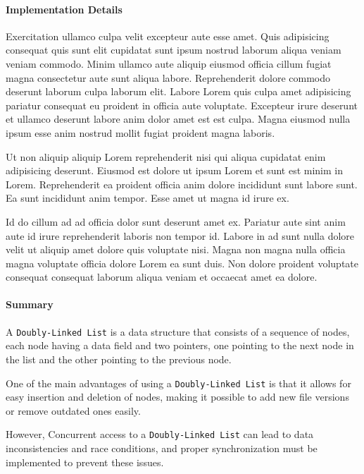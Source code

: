 \paragraph{Implementation Details}
Exercitation ullamco culpa velit excepteur aute esse amet. Quis adipisicing consequat quis sunt elit cupidatat sunt ipsum nostrud laborum aliqua veniam veniam commodo. Minim ullamco aute aliquip eiusmod officia cillum fugiat magna consectetur aute sunt aliqua labore. Reprehenderit dolore commodo deserunt laborum culpa laborum elit. Labore Lorem quis culpa amet adipisicing pariatur consequat eu proident in officia aute voluptate. Excepteur irure deserunt et ullamco deserunt labore anim dolor amet est est culpa. Magna eiusmod nulla ipsum esse anim nostrud mollit fugiat proident magna laboris.

Ut non aliquip aliquip Lorem reprehenderit nisi qui aliqua cupidatat enim adipisicing deserunt. Eiusmod est dolore ut ipsum Lorem et sunt est minim in Lorem. Reprehenderit ea proident officia anim dolore incididunt sunt labore sunt. Ea sunt incididunt anim tempor. Esse amet ut magna id irure ex.

Id do cillum ad ad officia dolor sunt deserunt amet ex. Pariatur aute sint anim aute id irure reprehenderit laboris non tempor id. Labore in ad sunt nulla dolore velit ut aliquip amet dolore quis voluptate nisi. Magna non magna nulla officia magna voluptate officia dolore Lorem ea sunt duis. Non dolore proident voluptate consequat consequat laborum aliqua veniam et occaecat amet ea dolore.

\paragraph{Summary}
A \lstinline{Doubly-Linked List} is a data structure that consists of a sequence of nodes, each node having a data field and two pointers, one pointing to the next node in the list and the other pointing to the previous node.

One of the main advantages of using a \lstinline{Doubly-Linked List} is that it allows for easy insertion and deletion of nodes, making it possible to add new file versions or remove outdated ones easily.

However, Concurrent access to a \lstinline{Doubly-Linked List} can lead to data inconsistencies and race conditions, and proper synchronization must be implemented to prevent these issues.

